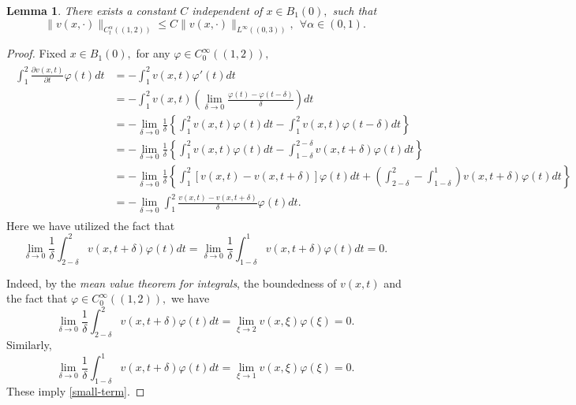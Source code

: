 \documentclass[10pt,a4paper]{amsart}
\newtheorem{lemma}{Lemma}
\begin{document}
\begin{lemma} \label{thm2.1.2}
There exists a constant $C$ independent of $x\in B_1(0),$ such that
$$
\|v(x,\cdot)\|_{C^{\alpha}_{t} ((1,2))} \leq C \|v(x,\cdot)\|_{L^\infty ((0,3))},\ \ \forall \alpha\in(0,1).
$$
\end{lemma}

\begin{proof} Fixed $x\in B_1(0),$ for any $\varphi\in C_0^\infty((1,2)),$
\begin{eqnarray}\label{est-t}
\begin{aligned}
\int_1^2\frac{\partial v(x,t)}{\partial t}\varphi(t)dt&=-\int_1^2v(x,t)\varphi'(t)dt\\
&=-\int_1^2v(x,t)\left(\lim\limits_{\delta\to 0}\frac{\varphi(t)-\varphi(t-\delta)}{\delta}\right)dt\\
&=-\lim\limits_{\delta\to 0}\frac{1}{\delta}\left\{\int_1^2v(x,t)\varphi(t)dt-\int_1^2v(x,t)\varphi(t-\delta)dt\right\}\\
&=-\lim\limits_{\delta\to 0}\frac{1}{\delta}\left\{\int_1^2v(x,t)\varphi(t)dt-\int_{1-\delta}^{2-\delta}v(x,t+\delta)\varphi(t)dt\right\}\\
&=-\lim\limits_{\delta\to 0}\frac{1}{\delta}\left\{\int_1^2[v(x,t)-v(x,t+\delta)]\varphi(t)dt+\left(\int_{2-\delta}^{2}
-\int_{1-\delta}^{1}\right)v(x,t+\delta)\varphi(t)dt\right\}\\
&=-\lim\limits_{\delta\to 0}\int_1^2\frac{v(x,t)-v(x,t+\delta)}{\delta}\varphi(t)dt.
\end{aligned}
\end{eqnarray}
Here we have utilized the fact that
\begin{equation}\label{small-term}\lim\limits_{\delta\to 0}\frac{1}{\delta}\int_{2-\delta}^{2}v(x,t+\delta)\varphi(t)dt=\lim\limits_{\delta\to 0}\frac{1}{\delta}\int_{1-\delta}^{1}v(x,t+\delta)\varphi(t)dt=0.\end{equation}

Indeed, by the {\em mean value theorem for integrals},   the boundedness of $v(x,t)$ and the fact that $\varphi\in C_0^\infty((1,2)),$ we have
\[\lim\limits_{\delta\to 0}\frac{1}{\delta}\int_{2-\delta}^{2}v(x,t+\delta)\varphi(t)dt=\lim\limits_{\xi\to 2}v(x,\xi)\varphi(\xi)=0.\]
Similarly,
\[\lim\limits_{\delta\to 0}\frac{1}{\delta}\int_{1-\delta}^{1}v(x,t+\delta)\varphi(t)dt=\lim\limits_{\xi\to 1}v(x,\xi)\varphi(\xi)=0.\]
These imply \eqref{small-term}.


\end{proof}
\end{document}
